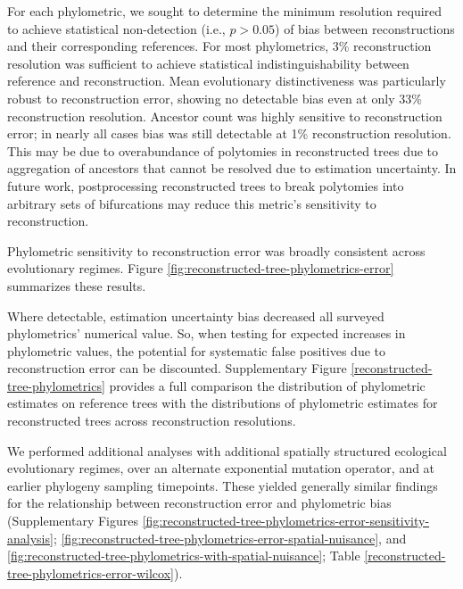 

For each phylometric, we sought to determine the minimum resolution required to achieve statistical non-detection (i.e., $p > 0.05$) of bias between reconstructions and their corresponding references. 
For most phylometrics, 3\% reconstruction resolution was sufficient to achieve statistical indistinguishability between reference and reconstruction.
Mean evolutionary distinctiveness was particularly robust to reconstruction error, showing no detectable bias even at only 33\% reconstruction resolution. 
Ancestor count was highly sensitive to reconstruction error; in nearly all cases bias was still detectable at 1\% reconstruction resolution.
This may be due to overabundance of polytomies in reconstructed trees due to aggregation of ancestors that cannot be resolved due to estimation uncertainty.
In future work, postprocessing reconstructed trees to break polytomies into arbitrary sets of bifurcations may reduce this metric's sensitivity to reconstruction.

Phylometric sensitivity to reconstruction error was broadly consistent across evolutionary regimes.
Figure \ref{fig:reconstructed-tree-phylometrics-error} summarizes these results.

Where detectable, estimation uncertainty bias decreased all surveyed phylometrics' numerical value.
So, when testing for expected increases in phylometric values, the potential for systematic false positives due to reconstruction error can be discounted. 
Supplementary Figure \ref{reconstructed-tree-phylometrics} provides a full comparison the distribution of phylometric estimates on reference trees with the distributions of phylometric estimates for reconstructed trees across reconstruction resolutions.

We performed additional analyses with additional spatially structured ecological evolutionary regimes, over an alternate exponential mutation operator, and at earlier phylogeny sampling timepoints.
These yielded generally similar findings for the relationship between reconstruction error and phylometric bias (Supplementary Figures \ref{fig:reconstructed-tree-phylometrics-error-sensitivity-analysis}; \ref{fig:reconstructed-tree-phylometrics-error-spatial-nuisance}, and \ref{fig:reconstructed-tree-phylometrics-with-spatial-nuisance};  Table \ref{reconstructed-tree-phylometrics-error-wilcox}).




